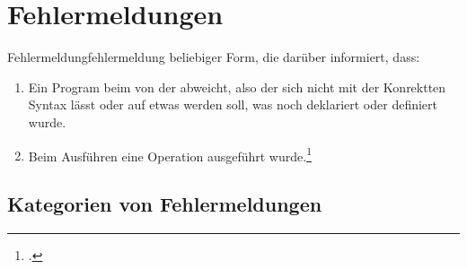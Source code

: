 \section{Fehlermeldungen}
\begin{Definition}{Fehlermeldung}{fehlermeldung}
   beliebiger Form, die darüber informiert, dass:
  \begin{enumerate}
    \item Ein Program beim  von der  abweicht, also der  sich nicht mit der Konrektten Syntax  lässt oder auf etwas  werden soll, was noch  deklariert oder definiert wurde.
    \item Beim Ausführen eine  Operation ausgeführt wurde.\footcite{noauthor_errors_nodate}
  \end{enumerate}
\end{Definition}
\subsection{Kategorien von Fehlermeldungen}

